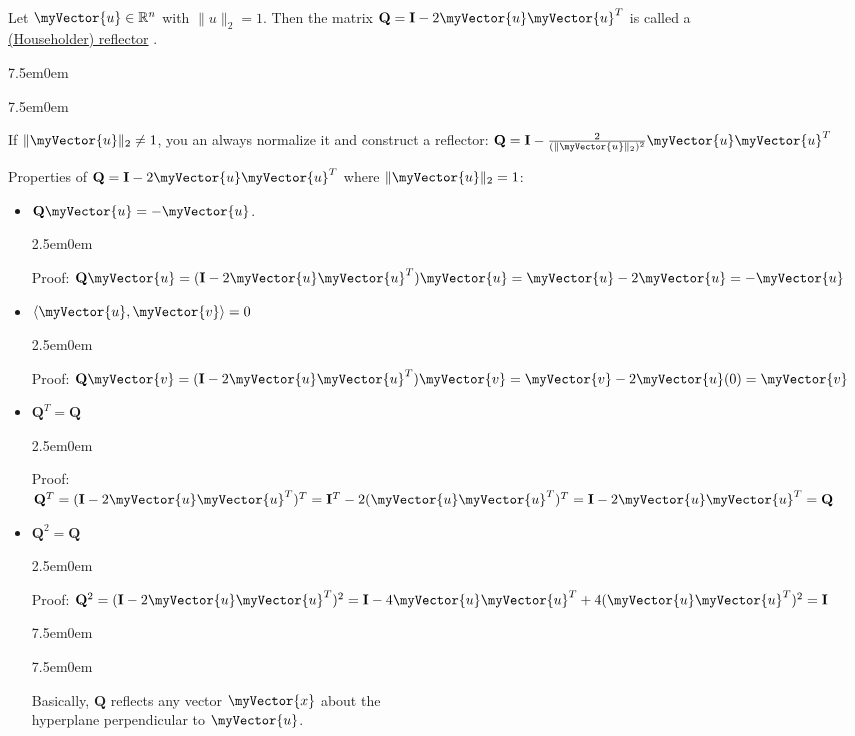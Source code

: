 \documentclass{book}
\newcommand{\hThree}{%
   \color{PineGreen}
   \fontsize{13}{15}\selectfont%
}
\newcommand{\hFour}{%
   \color{Cerulean}
   \fontsize{12}{14}\selectfont%
}
\newcommand{\teachComment}{
   \color{Orange}%
   \fontsize{12}{14}\selectfont%
}
\newenvironment{myIndent}{%
   \begin{adjustwidth}{2.5em}{0em}%
}{%
   \end{adjustwidth}%
}
\newenvironment{myTindent}{%
   \begin{adjustwidth}{7.5em}{0em}%
}{%
   \end{adjustwidth}%
}
\newcommand{\udefine}[1]{%
   {\setulcolor{Red}%
   \setul{0.14em}{0.07em}%
   \ul{#1}}%
}
\newcommand{\mySepTwo}[1][.]{%
   {\noindent\color{#1}{\rule{6.5in}{0.5mm}}}\\%
}
\newcommand{\retTwo}{\hfill\bigbreak}
\newcommand{\mVec}[1]{\myVector{#1}}
\newcommand{\mMat}[1]{\mathbf{#1}}
\begin{document}
   \mySepTwo

   Let $\mVec{u} \in \mathbb{R}^n$ with $\|u\|_2 = 1$. Then the matrix $\mMat{Q} = \mMat{I} - 2\mVec{u}\mVec{u}^T$ is called a\\ \udefine{(Householder) reflector}.
   
   {\begin{myTindent}\begin{myTindent} \teachComment
      If $\|\mVec{u}\|_2 \neq 1$, you an always normalize it and construct a reflector: $\mMat{Q} = \mMat{I} - \frac{2}{(\|\mVec{u}\|_2)^2}\mVec{u}\mVec{u}^T$ \\
   \end{myTindent}\end{myTindent}}

   Properties of $\mMat{Q} = \mMat{I} - 2\mVec{u}\mVec{u}^T$ where $\|\mVec{u}\|_2 = 1$:
   
   \begin{itemize}
      \item $\mMat{Q}\mVec{u} = -\mVec{u}$.
      {\begin{myIndent} \hThree
         Proof: $\mMat{Q}\mVec{u} = (\mMat{I} - 2\mVec{u}\mVec{u}^T)\mVec{u} = \mVec{u} - 2\mVec{u} = -\mVec{u}$
      \end{myIndent}}

      \item $\langle \mVec{u}, \mVec{v} \rangle = 0$
      {\begin{myIndent} \hThree
         Proof: $\mMat{Q}\mVec{v} = (\mMat{I} - 2\mVec{u}\mVec{u}^T)\mVec{v} = \mVec{v} - 2\mVec{u}(0) = \mVec{v}$
      \end{myIndent}}

      \item $\mMat{Q}^T = \mMat{Q}$
      {\begin{myIndent} \hThree
         Proof: $\mMat{Q}^T = (\mMat{I} - 2\mVec{u}\mVec{u}^T)^T = \mMat{I}^T - 2(\mVec{u}\mVec{u}^T)^T = \mMat{I} - 2\mVec{u}\mVec{u}^T = \mMat{Q}$
      \end{myIndent}}

      \item $\mMat{Q}^2 = \mMat{Q}$
      {\begin{myIndent} \hThree
         Proof: ${\mMat{Q}^2 = (\mMat{I} - 2\mVec{u}\mVec{u}^T)^2 = \mMat{I} - 4\mVec{u}\mVec{u}^T + 4(\mVec{u}\mVec{u}^T)^2 = \mMat{I}}$
      \end{myIndent}}

      
      {\begin{myTindent}\begin{myTindent} \hFour
         Basically, $\mMat{Q}$ reflects any vector $\mVec{x}$ about the\\ hyperplane perpendicular to $\mVec{u}$. \retTwo
      \end{myTindent}\end{myTindent}}
   \end{itemize}
\end{document}
